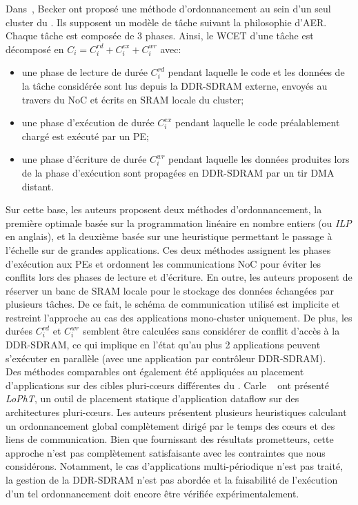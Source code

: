 \documentclass[main.tex]{subfiles}
\begin{document}
Dans~\cite{Becker16}, Becker \etal ont proposé une méthode d'ordonnancement au sein d'un seul cluster du \mppalong. Ils supposent un modèle de tâche suivant la philosophie d'AER. Chaque tâche est composée de 3 phases. Ainsi, le WCET d'une tâche est décomposé en $C_i = C_i^{rd} + C_i^{ex} + C_i^{wr}$ avec:
\begin{itemize}
    \item une phase de lecture de durée $C_i^{rd}$ pendant laquelle le code et les données de la tâche considérée sont lus depuis la DDR-SDRAM externe, envoyés au travers du NoC et écrits en SRAM locale du cluster;
    \item une phase d'exécution de durée $C_i^{ex}$ pendant laquelle le code préalablement chargé est exécuté par un PE;
    \item une phase d'écriture de durée $C_i^{wr}$ pendant laquelle les données produites lors de la phase d'exécution sont propagées en DDR-SDRAM par un tir DMA distant.
\end{itemize}
Sur cette base, les auteurs proposent deux méthodes d'ordonnancement, la première optimale basée sur la programmation linéaire en nombre entiers (ou \emph{ILP} en anglais), et la deuxième basée sur une heuristique permettant le passage à l'échelle sur de grandes applications. Ces deux méthodes assignent les phases d'exécution aux PEs et ordonnent les communications NoC pour éviter les conflits lors des phases de lecture et d'écriture. En outre, les auteurs proposent de réserver un banc de SRAM locale pour le stockage des données échangées par plusieurs tâches. De ce fait, le schéma de communication utilisé est implicite et restreint l'approche au cas des applications mono-cluster uniquement. De plus, les durées $C_i^{rd}$ et $C_i^{wr}$ semblent être calculées sans considérer de conflit d'accès à la DDR-SDRAM, ce qui implique en l'état qu'au plus 2 applications peuvent s'exécuter en parallèle (avec une application par contrôleur DDR-SDRAM). \\


Des méthodes comparables ont également été appliquées au placement d'applications sur des cibles pluri-c\oe{}urs différentes du \mppalong. Carle \etal~\cite{Carle2014} ont présenté \emph{LoPhT}, un outil de placement statique d'application dataflow sur des architectures pluri-c\oe{}urs. Les auteurs présentent plusieurs heuristiques calculant un ordonnancement global complètement dirigé par le temps des c\oe{}urs et des liens de communication. Bien que fournissant des résultats prometteurs, cette approche n'est pas complètement satisfaisante avec les contraintes que nous considérons. Notamment, le cas d'applications multi-périodique n'est pas traité, la gestion de la DDR-SDRAM n'est pas abordée et la faisabilité de l'exécution d'un tel ordonnancement doit encore être vérifiée expérimentalement.
\end{document}
